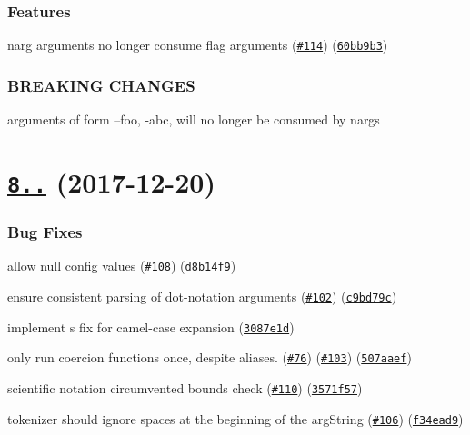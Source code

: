 \subsubsection*{Features}


\begin{DoxyItemize}
\item narg arguments no longer consume flag arguments (\href{https://github.com/yargs/yargs-parser/issues/114}{\tt \#114}) (\href{https://github.com/yargs/yargs-parser/commit/60bb9b3}{\tt 60bb9b3})
\end{DoxyItemize}

\subsubsection*{B\+R\+E\+A\+K\+I\+NG C\+H\+A\+N\+G\+ES}


\begin{DoxyItemize}
\item arguments of form --foo, -\/abc, will no longer be consumed by nargs
\end{DoxyItemize}

\label{_8.1.0}%
 \section*{\href{https://github.com/yargs/yargs-parser/compare/v8.0.0...v8.1.0}{\tt 8..} (2017-\/12-\/20)}

\subsubsection*{Bug Fixes}


\begin{DoxyItemize}
\item allow null config values (\href{https://github.com/yargs/yargs-parser/issues/108}{\tt \#108}) (\href{https://github.com/yargs/yargs-parser/commit/d8b14f9}{\tt d8b14f9})
\item ensure consistent parsing of dot-\/notation arguments (\href{https://github.com/yargs/yargs-parser/issues/102}{\tt \#102}) (\href{https://github.com/yargs/yargs-parser/commit/c9bd79c}{\tt c9bd79c})
\item implement \href{https://github.com/antoniom}{\tt }\textquotesingle{}s fix for camel-\/case expansion (\href{https://github.com/yargs/yargs-parser/commit/3087e1d}{\tt 3087e1d})
\item only run coercion functions once, despite aliases. (\href{https://github.com/yargs/yargs-parser/issues/76}{\tt \#76}) (\href{https://github.com/yargs/yargs-parser/issues/103}{\tt \#103}) (\href{https://github.com/yargs/yargs-parser/commit/507aaef}{\tt 507aaef})
\item scientific notation circumvented bounds check (\href{https://github.com/yargs/yargs-parser/issues/110}{\tt \#110}) (\href{https://github.com/yargs/yargs-parser/commit/3571f57}{\tt 3571f57})
\item tokenizer should ignore spaces at the beginning of the arg\+String (\href{https://github.com/yargs/yargs-parser/issues/106}{\tt \#106}) (\href{https://github.com/yargs/yargs-parser/commit/f34ead9}{\tt f34ead9})
\end{DoxyItemize}

